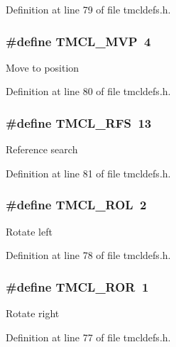 Definition at line 79 of file tmcldefs.h.\hypertarget{group__MotionComm_ga109d51fee8df715b9e18b6c49b785757}{
\subsubsection[{TMCL\_\-MVP}]{\setlength{\rightskip}{0pt plus 5cm}\#define TMCL\_\-MVP~4}}
\label{group__MotionComm_ga109d51fee8df715b9e18b6c49b785757}
Move to position 

Definition at line 80 of file tmcldefs.h.\hypertarget{group__MotionComm_ga316ddf99f164783c8488c48ce9346c21}{
\subsubsection[{TMCL\_\-RFS}]{\setlength{\rightskip}{0pt plus 5cm}\#define TMCL\_\-RFS~13}}
\label{group__MotionComm_ga316ddf99f164783c8488c48ce9346c21}
Reference search 

Definition at line 81 of file tmcldefs.h.\hypertarget{group__MotionComm_ga90f30df41b6fa29a3e94c909e655af94}{
\subsubsection[{TMCL\_\-ROL}]{\setlength{\rightskip}{0pt plus 5cm}\#define TMCL\_\-ROL~2}}
\label{group__MotionComm_ga90f30df41b6fa29a3e94c909e655af94}
Rotate left 

Definition at line 78 of file tmcldefs.h.\hypertarget{group__MotionComm_gae60969d45c586023c9bd2db9498cc508}{
\subsubsection[{TMCL\_\-ROR}]{\setlength{\rightskip}{0pt plus 5cm}\#define TMCL\_\-ROR~1}}
\label{group__MotionComm_gae60969d45c586023c9bd2db9498cc508}
Rotate right 

Definition at line 77 of file tmcldefs.h.